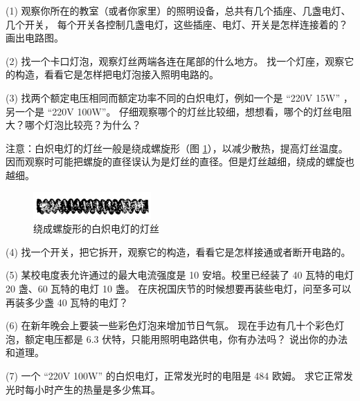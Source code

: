 (1) 观察你所在的教室（或者你家里）的照明设备，总共有几个插座、几盏电灯、几个开关，
每个开关各控制几盏电灯，这些插座、电灯、开关是怎样连接着的？画出电路图。

(2) 找一个卡口灯泡，观察灯丝两端各连在尾部的什么地方。
找一个灯座，观察它的构造，看看它是怎样把电灯泡接入照明电路的。

(3) 找两个额定电压相同而额定功率不同的白炽电灯，例如一个是 “220V \; 15W” ，另一个是 “220V \; 100W”。
仔细观察哪个的灯丝比较细，想想看，哪个的灯丝电阻大？哪个灯泡比较亮？为什么？

注意：白炽电灯的灯丝一般是绕成螺旋形（图 \ref{fig:11-4}），以减少散热，提高灯丝温度。
因而观察时可能把螺旋的直径误认为是灯丝的直径。但是灯丝越细，绕成的螺旋也越细。

\begin{figure}[H]%
    \centering
    \includegraphics[width=0.4\textwidth]{../pic/czwl2-ch11-4}
    \caption{绕成螺旋形的白炽电灯的灯丝}\label{fig:11-4}
\end{figure}

(4) 找一个开关，把它拆开，观察它的构造，看看它是怎样接通或者断开电路的。

(5) 某校电度表允许通过的最大电流强度是 10 安培。校里已经装了 40 瓦特的电灯 20 盏、60 瓦特的电灯 10 盏。
在庆祝国庆节的时候想要再装些电灯，问至多可以再装多少盏 40 瓦特的电灯？

(6) 在新年晚会上要装一些彩色灯泡来增加节日气氛。
现在手边有几十个彩色灯泡，额定电压都是 6.3 伏特，只能用照明电路供电，你有办法吗？
说出你的办法和道理。

(7) 一个 “220V \; 100W” 的白炽电灯，正常发光时的电阻是 484 欧姆。
求它正常发光时每小时产生的热量是多少焦耳。

